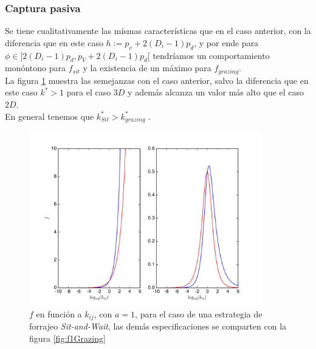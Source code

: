 \subsubsection{Captura pasiva}

Se tiene cualitativamente las m\'ismas caracter\'isticas que en el caso anterior, con la diferencia que en este caso $ h:= p_v + 2(D_i -1) p_d$, y por ende para $\phi \in ]2(D_i - 1) p_d , p_V + 2(D_i -1)p_d[$ tendr\'iamos un comportamiento mon\'ontono para $f_{sit}$ y la existencia de un m\'aximo para $f_{grazing}$.\\

La figura \ref{fig:f1Sit} muestra las semejanzas con el caso anterior, salvo la diferencia que en este caso $k^*>1$ para el caso $3D$ y adem\'as alcanza un valor m\'as alto que el caso $2D$.\\
En general tenemos que $ k^*_{Sit} > k^*_{grazing}$ .

\begin{figure}
\begin{center}
 \includegraphics[width=0.9\textwidth]{./Plots/f1Sit.pdf}
 \caption[$f_1, Sit$]{$f$ en funci\'on a $k_{ij}$, con $a =1$, para el caso de una estrategia de forrajeo \emph{Sit-and-Wait}, las dem\'as especificaciones se comparten con la figura \ref{fig:f1Grazing}}
 \label{fig:f1Sit} 
\end{center}
\end{figure}


